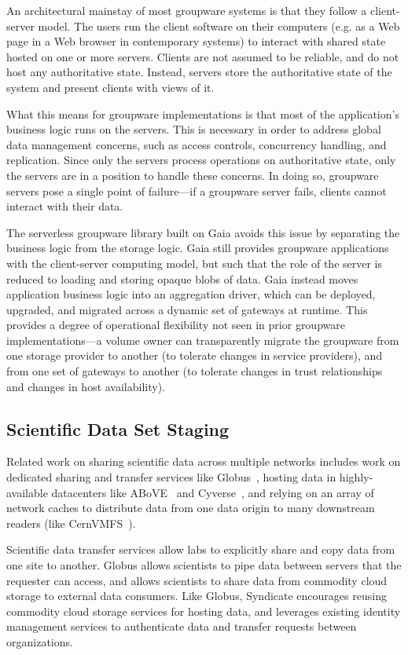 An architectural mainstay of most groupware systems is that they follow a client-server model.
The users run the client software on their computers (e.g.
as a Web page in a Web browser in contemporary systems) to interact with shared state hosted on one or
more servers.  Clients are not assumed to be reliable, and do not host any
authoritative state.  Instead, servers store the authoritative state of the system and
present clients with views of it.

What this means for groupware implementations is that most of the application's business logic runs on the
servers.  This is necessary in order to address global data management
concerns, such as access controls, concurrency handling, and
replication.  Since only the servers process operations on authoritative state, only
the servers are in a position to handle these concerns.  In doing so, groupware
servers pose a single point of failure---if a groupware server fails, clients
cannot interact with their data.

The serverless groupware library built on Gaia
avoids this issue by separating the business logic from the storage logic.
Gaia still provides groupware applications with the client-server computing model,
but such that the role of the server is reduced to loading
and storing opaque blobs of data.  Gaia instead
moves application business logic into an aggregation driver, which can be
deployed, upgraded, and migrated across a dynamic set of gateways at runtime.
This provides a degree of operational flexibility not seen in prior groupware
implementations---a volume owner can transparently migrate the groupware from
one storage provider to another (to tolerate changes in service providers),
and from one set of gateways to another (to tolerate changes in trust relationships and
changes in host availability).

\subsection{Scientific Data Set Staging}

Related work on sharing scientific data across multiple networks includes
work on dedicated sharing and transfer services like Globus~\cite{globus},
hosting data in highly-available datacenters like ABoVE~\cite{nasa-above} and
Cyverse~\cite{cyverse}, and relying on an array of network caches to distribute
data from one data origin to many downstream readers (like
CernVMFS~\cite{cernvmfs}).

Scientific data transfer services allow labs to explicitly share and copy
data from one site to another.  Globus allows scientists to pipe data between
servers that the requester can access, and allows scientists to share data from
commodity cloud storage to external data consumers.  Like Globus, Syndicate
encourages reusing commodity cloud storage services for hosting data, and
leverages existing identity management services to authenticate data and
transfer requests between organizations.

